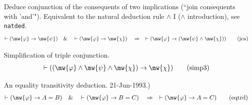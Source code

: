 \begin{lemma} Deduce conjunction of the consequents of two
implications (``join
       consequents with 'and'").  Equivalent to the natural deduction rule
       $\wedge$ I ($\wedge$ introduction), see {\tt natded}.  
\begin{align}
\vdash ( \mw{\varphi} \rightarrow \mw{\psi} )\quad\&\quad \vdash ( \mw{\varphi}
    \rightarrow \mw{\chi} )\quad\Rightarrow\quad \vdash ( \mw{\varphi}
    \rightarrow ( \mw{\psi} \wedge \mw{\chi} ) )\label{eq:jca}\tag{jca}
\end{align}
\end{lemma}


\begin{lemma} Simplification of triple conjunction. 
\begin{align}
\vdash ( ( \mw{\varphi} \wedge \mw{\psi} \wedge \mw{\chi} ) \rightarrow
    \mw{\chi} )\label{eq:simp3}\tag{simp3}
\end{align}
\end{lemma}


\begin{lemma} An equality transitivity deduction. 
      21-Jun-1993.)
\begin{align}
\vdash ( \mw{\varphi} \rightarrow A = B )\quad\&\quad \vdash ( \mw{\varphi}
    \rightarrow B = C )\quad\Rightarrow\quad \vdash ( \mw{\varphi} \rightarrow
    A = C )\label{eq:eqtrd}\tag{eqtrd}
\end{align}
\end{lemma}




